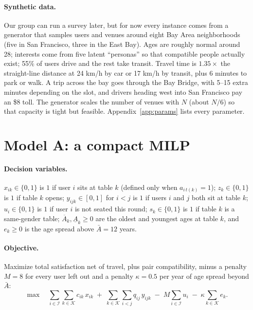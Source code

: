 \documentclass[10pt]{article}
\newcommand{\I}{\mathcal{I}}
\newcommand{\K}{\mathcal{K}}
\begin{document}
\paragraph{Synthetic data.} Our group can run a survey later, but for now every instance comes from a generator that samples users and venues around eight Bay Area neighborhoods (five in San Francisco, three in the East Bay). Ages are roughly normal around 28; interests come from five latent ``personas'' so that compatible people actually exist; 55\% of users drive and the rest take transit. Travel time is $1.35\times$ the straight-line distance at 24 km/h by car or 17 km/h by transit, plus 6 minutes to park or walk. A trip across the bay goes through the Bay Bridge, with 5--15 extra minutes depending on the slot, and drivers heading west into San Francisco pay an \$8 toll. The generator scales the number of venues with $N$ (about $N/6$) so that capacity is tight but feasible. Appendix~\ref{app:params} lists every parameter.

\section{Model A: a compact MILP}
\label{sec:modelA}

\paragraph{Decision variables.}
$x_{ik}\in\{0,1\}$ is $1$ if user $i$ sits at table $k$ (defined only when $a_{i\,t(k)}=1$);
$z_k\in\{0,1\}$ is $1$ if table $k$ opens;
$y_{ijk}\in[0,1]$ for $i<j$ is $1$ if users $i$ and $j$ both sit at table $k$;
$u_i\in\{0,1\}$ is $1$ if user $i$ is not seated this round;
$s_k\in\{0,1\}$ is $1$ if table $k$ is a same-gender table;
$\overline{A}_k,\underline{A}_k\ge 0$ are the oldest and youngest ages at table $k$, and $e_k\ge 0$ is the age spread above $\bar{A}=12$ years.

\paragraph{Objective.} Maximize total satisfaction net of travel, plus pair compatibility, minus a penalty $M=8$ for every user left out and a penalty $\kappa=0.5$ per year of age spread beyond $\bar A$:
\begin{equation}
\max\quad \sum_{i\in\I}\sum_{k\in\K} c_{ik}\,x_{ik} \;+\; \sum_{k\in\K}\sum_{i<j} q_{ij}\,y_{ijk} \;-\; M\sum_{i\in\I}u_i \;-\; \kappa\sum_{k\in\K} e_k .
\label{eq:objA}
\end{equation}
\end{document}
